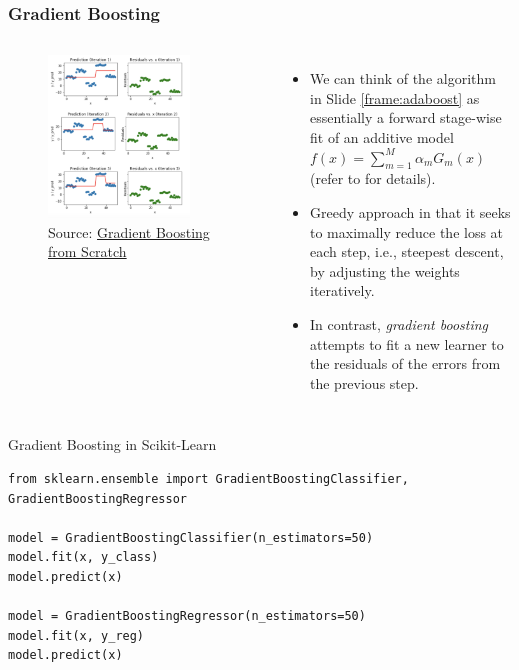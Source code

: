 \documentclass{beamer}
\begin{document}
\begin{frame}
\frametitle{Gradient Boosting}
\begin{columns}
\begin{figure}
    \centering
    \includegraphics[width=0.8\textwidth]{figures/gradientboostingalgo.png}
    \caption{Source: \href{https://medium.com/mlreview/gradient-boosting-from-scratch-1e317ae4587d}{Gradient Boosting from Scratch}}
\end{figure}
    \begin{itemize}
        \item We can think of the algorithm in Slide \ref{frame:adaboost} as essentially a forward stage-wise fit of an additive model $f(x) = \sum_{m=1}^M \alpha_m G_m(x)$ (refer to \cite{hastieElementsStatisticalLearning2016} for details).
        \item Greedy approach in that it seeks to maximally reduce the loss at each step, i.e., steepest descent, by adjusting the weights iteratively.
        \item In contrast, \textit{gradient boosting} attempts to fit a new learner to the residuals of the errors from the previous step. 
    \end{itemize}
\end{columns}
\end{frame}


\begin{frame}[fragile]{Gradient Boosting in Scikit-Learn}
\begin{verbatim}
from sklearn.ensemble import GradientBoostingClassifier, GradientBoostingRegressor

model = GradientBoostingClassifier(n_estimators=50)
model.fit(x, y_class)
model.predict(x)

model = GradientBoostingRegressor(n_estimators=50)
model.fit(x, y_reg)
model.predict(x)

\end{verbatim}
\end{frame}
\end{document}

